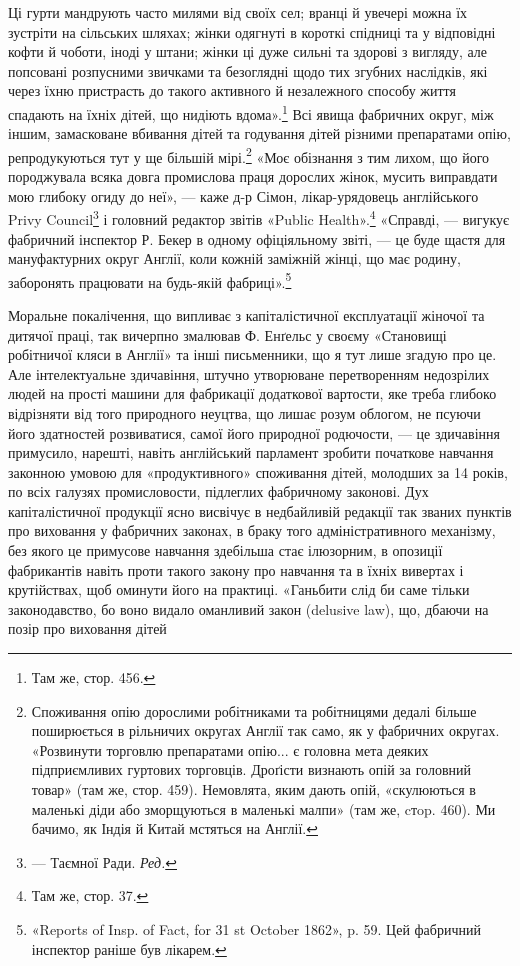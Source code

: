 Ці гурти мандрують часто милями від своїх сел; вранці й увечері
можна їх зустріти на сільських шляхах; жінки одягнуті в короткі
спідниці та у відповідні кофти й чоботи, іноді у штани; жінки ці
дуже сильні та здорові з вигляду, але попсовані розпусними
звичками та безоглядні щодо тих згубних наслідків, які через
їхню пристрасть до такого активного й незалежного способу
життя спадають на їхніх дітей, що нидіють вдома».\footnote{
Там же, стор. 456.
} Всі явища
фабричних округ, між іншим, замасковане вбивання дітей та
годування дітей різними препаратами опію, репродукуються тут
у ще більшій мірі.\footnote{
Споживання опію дорослими робітниками та робітницями дедалі
більше поширюється в рільничих округах Англії так само, як у фабричних
округах. «Розвинути торговлю препаратами опію... є головна мета
деяких підприємливих гуртових торговців. Дроґісти визнають опій за
головний товар» (там же, стор. 459). Немовлята, яким дають опій, «скулюються
в маленькі діди або зморщуються в маленькі малпи» (там же,
cтop. 460). Ми бачимо, як Індія й Китай мстяться на Англії.
} «Моє обізнання з тим лихом, що його породжувала
всяка довга промислова праця дорослих жінок, мусить
виправдати мою глибоку огиду до неї», — каже д-р Сімон,
лікар-урядовець англійського Privy Council\footnote*{
— Таємної Ради. \emph{Ред.}
} і головний редактор
звітів «Public Health».\footnote{
Там же, стор. 37.
} «Справді, — вигукує фабричний
інспектор Р. Бекер в одному офіціяльному звіті, — це буде
щастя для мануфактурних округ Англії, коли кожній заміжній
жінці, що має родину, заборонять працювати на будь-якій
фабриці».\footnote{
«Reports of Insp. of Fact, for 31 st October 1862», p. 59. Цей фабричний
інспектор раніше був лікарем.
}

Моральне покалічення, що випливає з капіталістичної експлуатації
жіночої та дитячої праці, так вичерпно змалював Ф. Енґельс
у своєму «Становищі робітничої кляси в Англії» та інші письменники,
що я тут лише згадую про це. Але інтелектуальне здичавіння,
штучно утворюване перетворенням недозрілих людей на
прості машини для фабрикації додаткової вартости, яке треба
глибоко відрізняти від того природного неуцтва, що лишає розум
облогом, не псуючи його здатностей розвиватися, самої його природної
родючости, — це здичавіння примусило, нарешті, навіть
англійський парламент зробити початкове навчання законною
умовою для «продуктивного» споживання дітей, молодших за
14 років, по всіх галузях промисловости, підлеглих фабричному
законові. Дух капіталістичної продукції ясно висвічує в недбайливій
редакції так званих пунктів про виховання у фабричних
законах, в браку того адміністративного механізму, без якого це
примусове навчання здебільша стає ілюзорним, в опозиції фабрикантів
навіть проти такого закону про навчання та в їхніх вивертах
і крутійствах, щоб оминути його на практиці. «Ганьбити
слід би саме тільки законодавство, бо воно видало оманливий
закон (delusive law), що, дбаючи на позір про виховання дітей